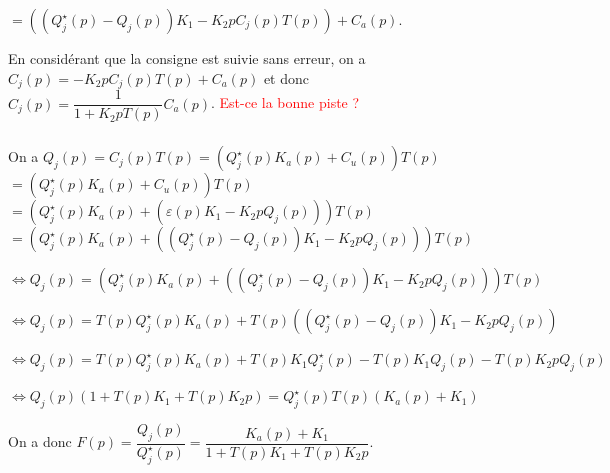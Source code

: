 \documentclass[10pt,fleqn]{article} %
\begin{document}
$=\left( \left( Q_j^\star (p)-Q_j(p)\right)K_1 - K_2 p C_j(p) T(p)\right) + C_a(p) $.

En considérant que  la consigne est suivie sans erreur, on a 
$C_j(p)= - K_2 p C_j(p) T(p) + C_a(p) $ et donc $C_j(p)=\dfrac{1}{1+K_2p T(p)}C_a(p)$.
\textcolor{red}{Est-ce la bonne piste ?}
\subparagraph{}\textit{}%

On a $Q_j(p) = C_j(p) T(p)= \left( Q_j^{\star}(p) K_a(p) + C_u(p) \right) T(p)$
$= \left( Q_j^{\star}(p) K_a(p) + C_u(p) \right) T(p)$
$= \left( Q_j^{\star}(p) K_a(p) + \left( \varepsilon(p) K_1 - K_2 p Q_j(p) \right)\right) T(p)$
$= \left( Q_j^{\star}(p) K_a(p) + \left( \left(Q_j^{\star}(p) - Q_j(p) \right) K_1 - K_2 p Q_j(p) \right)\right) T(p)$


$\Leftrightarrow Q_j(p) = 
\left(
    Q_j^{\star}(p) K_a(p) + 
    \left( 
        \left(Q_j^{\star}(p) - Q_j(p) \right) K_1 - K_2 p Q_j(p) 
    \right)
\right) T(p)$

$\Leftrightarrow Q_j(p) = 
    T(p)Q_j^{\star}(p) K_a(p) + 
    T(p)\left( 
        \left(Q_j^{\star}(p) - Q_j(p) \right) K_1 - K_2 p Q_j(p) 
    \right) $

$\Leftrightarrow Q_j(p) = 
    T(p)Q_j^{\star}(p) K_a(p) + 
        T(p)K_1 Q_j^{\star}(p) -T(p)K_1  Q_j(p)   - T(p)K_2 p Q_j(p) 
     $

$\Leftrightarrow Q_j(p)\left(1     +T(p)K_1     + T(p)K_2 p\right)= 
      Q_j^{\star}(p)T(p) \left(  K_a(p)     +K_1 \right)     $

On a donc $F(p)=\dfrac{Q_j(p)}{Q_j^{\star}(p)}=\dfrac{ K_a(p) +K_1}{1+T(p)K_1 + T(p)K_2 p}$.


\subparagraph{}\textit{}%

\subparagraph{}\textit{}%
\end{document}
